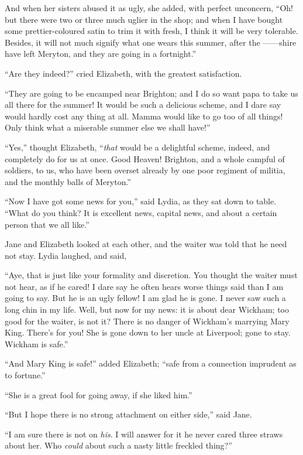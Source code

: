 And when her sisters abused it as ugly, she added,
with perfect unconcern, “Oh! but there were two or
three much uglier in the shop; and when I have bought
some prettier-coloured satin to trim it with fresh, I think
it will be very tolerable. Besides, it will not much signify
what one wears this summer, after the ------shire have
left Meryton, and they are going in a fortnight.”

“Are they indeed?” cried Elizabeth, with the greatest
satisfaction.

“They are going to be encamped near Brighton; and
I do so want papa to take us all there for the summer!
It would be such a delicious scheme, and I dare say
would hardly cost any thing at all. Mamma would like
to go too of all things! Only think what a miserable
summer else we shall have!”

“Yes,” thought Elizabeth, “\textit{that} would be a delightful
sch\-eme, indeed, and completely do for us at once.
Good Heaven! Brighton, and a whole campful of soldiers,
to us, who have been overset already by one poor regiment
of militia, and the monthly balls of Meryton.”

“Now I have got some news for you,” said Lydia, as
they sat down to table. “What do you think? It is
excellent news, capital news, and about a certain person
that we all like.”

Jane and Elizabeth looked at each other, and the
waiter was told that he need not stay. Lydia laughed,
and said,

“Aye, that is just like your formality and discretion.
You thought the waiter must not hear, as if he cared!
I dare say he often hears worse things said than I am
going to say. But he is an ugly fellow! I am glad he is
gone. I never saw such a long chin in my life. Well, but
now for my news: it is about dear Wickham; too good
for the waiter, is not it? There is no danger of Wickham’s
marrying Mary King. There’s for you! She is gone down
to her uncle at Liverpool; gone to stay. Wickham is
safe.”

“And Mary King is safe!” added Elizabeth; “safe
from a connection imprudent as to fortune.”

“She is a great fool for going away, if she liked him.”

“But I hope there is no strong attachment on either
side,” said Jane.

“I am sure there is not on \textit{his}. I will answer for it
he never cared three straws about her. Who \textit{could} about
such a nasty little freckled thing?”

